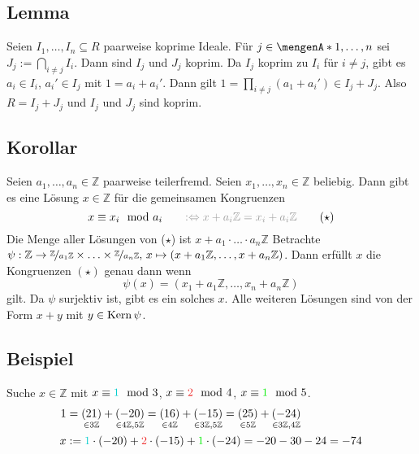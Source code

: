 \subsection[Lemma: Hilfslemma für den Chinesischen Restsatz]{Lemma} %
\label{sub:619}
Seien $I_1, \ldots , I_n \subseteq R$ paarweise koprime Ideale. Für $j \in \set{1, \ldots ,n} $ sei $J_j := \bigcap_{i\not= j} I_i$. Dann sind $I_j$ und $J_j$ koprim.
Da $I_j $ koprim zu $I_i$ für $i \not= j$, gibt es $a_i \in I_i$, $a_i' \in I_j$ mit $1= a_i + a_i'$. Dann gilt $1 = \prod_{i \not= j}( a_1 +a_i') \in I_j + J_j$. Also
$R = I_j + J_j$ und $I_j$ und $J_j$ sind koprim.

\subsection[Korollar zur Lösung von Kongruenzen]{Korollar} %
\label{sub:620}
Seien $a_1, \ldots , a_n \in \mathds{Z}$ paarweise teilerfremd. Seien $x_1, \ldots , x_n \in \mathds{Z}$ beliebig. Dann gibt es eine Lösung $x \in \mathds{Z}$ für die 
gemeinsamen Kongruenzen
\[
	x  \equiv x_i \mod a_i  \qquad {\color{light_gray} :\Leftrightarrow x + a_i \mathds{Z} = x_i + a_i \mathds{Z}} \tag{$\star$}
\]
Die Menge aller Lösungen von ($\star$) ist $x+ a_1 \cdot \ldots \cdot a_n \mathds{Z}$
Betrachte $\psi : \mathds{Z} \to \nicefrac{\mathds{Z}}{a_1 \mathds{Z}}  \times \ldots \times \nicefrac{\mathds{Z}}{a_n \mathds{Z}} ,\, x \mapsto (x+a_1 \mathds{Z}, \ldots , x+ a_n \mathds{Z})$. Dann erfüllt $x$ die Kongruenzen $(\star)$ genau dann wenn
\[
	\psi(x) = (x_1 + a_1 \mathds{Z}, \ldots , x_n + a_n \mathds{Z})
\]
gilt. Da $\psi$ surjektiv ist, gibt es ein solches $x$. Alle weiteren Lösungen sind von der Form $x+y$ mit $y \in \Kern \psi$. \bewende

\subsection[Beispiel: Bestimmung einer Lösung von Kongruenzen]{Beispiel} %
\label{sub:621}
Suche $x \in \mathds{Z}$ mit $x \equiv {\color{Cyan3} 1} \mod 3$, $x \equiv {\color{Firebrick2} 2} \mod 4$, $x \equiv {\color{Green2}1} \mod 5$. 
\begin{align*}
	1 &= \underset{\in 3 \mathds{Z}}{(21)} + \underset{\in 4 \mathds{Z}, 5 \mathds{Z}}{(-20)} = \underset{\in 4 \mathds{Z}}{(16)} +  \underset{\in 3 \mathds{Z}, 5 \mathds{Z}}{(-15)} = \underset{\in 5 \mathds{Z}}{(25)} + \underset{\in 3 \mathds{Z}, 4 \mathds{Z}}{(-24)} \\
	x &:= {\color{Cyan3} 1} \cdot (-20) + {\color{Firebrick2} 2} \cdot (-15) + {\color{Green2}1} \cdot (-24) = -20 -30-24 = -74
\end{align*}
\newpage


